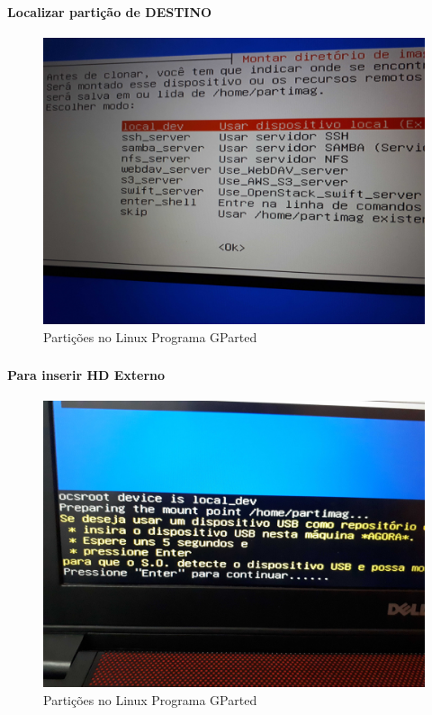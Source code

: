 \documentclass{beamer}
\begin{document}
\begin{frame}[plain,c]
   \frametitle{\insertsection}
    \framesubtitle{Localizar partição de DESTINO}
    \begin{figure}[!h]
        
        \includegraphics[width=1\linewidth]{images/backup/bkp7.jpg}
        \caption{Partições no Linux Programa GParted}
    \end{figure}
\end{frame}

\begin{frame}[plain,c]
   \frametitle{\insertsection}
    \framesubtitle{Para inserir HD Externo}
    \begin{figure}[!h]
        
        \includegraphics[width=1\linewidth]{images/backup/bkp8.jpg}
        \caption{Partições no Linux Programa GParted}
    \end{figure}
\end{frame}
\end{document}
